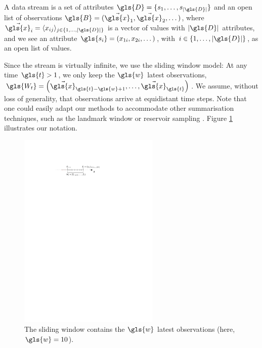 A data stream is a set of attributes $\gls{D}=\{s_1, \dots, s_{|\gls{D}|}\}$ and an open list of observations $\gls{B} = (\vec{\gls{x}}_{1}, \vec{\gls{x}}_{2}, \dots)$, where $\vec{\gls{x}}_i = \langle x_{ij} \rangle_{j \in \{1, \dots, |\gls{D}|\}}$ is a vector of values with $|\gls{D}|$ attributes, and we see an attribute $\gls{s_i} = (x_{1i},x_{2i},\dots)$, with $i \in \{1,\dots,|\gls{D}|\}$, as an open list of values. %

Since the stream is virtually infinite, we use the sliding window model: At any time $\gls{t} > 1$, we only keep the $\gls{w}$ latest observations, $\gls{W_t} = \left(\vec{\gls{x}}_{\gls{t}-\gls{w}+1}, \dots, \vec{\gls{x}}_{\gls{t}} \right)$. We assume, without loss of generality, that observations arrive at equidistant time steps. Note that one could easily adapt our methods to accommodate other summarisation techniques, such as the landmark window or reservoir sampling \cite{DBLP:journals/pai/Gama12}. %
Figure \ref{fig:slidingwindow} illustrates our notation. 

\begin{figure}
	\centering
	\includegraphics[width=0.6\textwidth]{part1-figures/slidingwindow-compressed.pdf}
	\caption{The sliding window contains the $\gls{w}$ latest observations (here, $\gls{w}=10$).}\label{fig:slidingwindow}
\end{figure}


